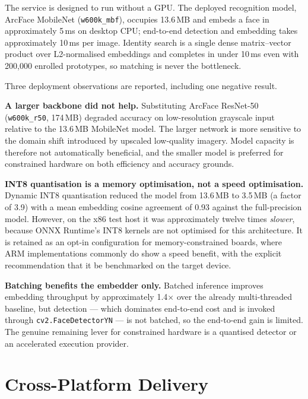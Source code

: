 \documentclass[12pt,a4paper]{report}
\begin{document}
The service is designed to run without a GPU. The deployed recognition model,
ArcFace MobileNet (\texttt{w600k\_mbf}), occupies 13.6\,MB and embeds a face in
approximately 5\,ms on desktop CPU; end-to-end detection and embedding takes
approximately 10\,ms per image. Identity search is a single dense matrix--vector
product over L2-normalised embeddings and completes in under 10\,ms even with
200{,}000 enrolled prototypes, so matching is never the bottleneck.

Three deployment observations are reported, including one negative result.

\textbf{A larger backbone did not help.} Substituting ArcFace ResNet-50
(\texttt{w600k\_r50}, 174\,MB) degraded accuracy on low-resolution grayscale input
relative to the 13.6\,MB MobileNet model. The larger network is more sensitive to
the domain shift introduced by upscaled low-quality imagery. Model capacity is
therefore not automatically beneficial, and the smaller model is preferred for
constrained hardware on both efficiency and accuracy grounds.

\textbf{INT8 quantisation is a memory optimisation, not a speed optimisation.}
Dynamic INT8 quantisation reduced the model from 13.6\,MB to 3.5\,MB (a factor of
3.9) with a mean embedding cosine agreement of 0.93 against the full-precision
model. However, on the x86 test host it was approximately twelve times
\emph{slower}, because ONNX Runtime's INT8 kernels are not optimised for this
architecture. It is retained as an opt-in configuration for memory-constrained
boards, where ARM implementations commonly do show a speed benefit, with the
explicit recommendation that it be benchmarked on the target device.

\textbf{Batching benefits the embedder only.} Batched inference improves embedding
throughput by approximately 1.4$\times$ over the already multi-threaded baseline,
but detection --- which dominates end-to-end cost and is invoked through
\texttt{cv2.FaceDetectorYN} --- is not batched, so the end-to-end gain is limited.
The genuine remaining lever for constrained hardware is a quantised detector or an
accelerated execution provider.

\section{Cross-Platform Delivery}
\label{sec:cross-platform}
\end{document}
